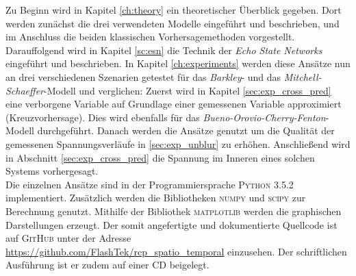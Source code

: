 Zu Beginn wird in Kapitel \ref{ch:theory} ein theoretischer Überblick gegeben. Dort werden zunächst die drei verwendeten Modelle eingeführt und beschrieben, und im Anschluss die beiden klassischen Vorhersagemethoden vorgestellt. Darauffolgend wird in Kapitel \ref{sc:esn} die Technik der \textit{Echo State Networks} eingeführt und beschrieben. In Kapitel \ref{ch:experiments} werden diese Ansätze nun an drei verschiedenen Szenarien getestet für das \textit{Barkley}- und das \textit{Mitchell-Schaeffer}-Modell und verglichen: Zuerst wird in Kapitel \ref{sec:exp_cross_pred} eine verborgene Variable auf Grundlage einer gemessenen Variable approximiert (Kreuzvorhersage). Dies wird ebenfalls für das \textit{Bueno-Orovio-Cherry-Fenton}-Modell durchgeführt. Danach werden die Ansätze genutzt um die Qualität der gemessenen Spannungsverläufe in \ref{sec:exp_unblur} zu erhöhen. Anschließend wird in Abschnitt \ref{sec:exp_cross_pred} die Spannung im Inneren eines solchen Systems vorhergesagt.\\

Die einzelnen Ansätze sind in der Programmiersprache \textsc{Python 3.5.2} implementiert. Zusätzlich werden die Bibliotheken \textsc{numpy} und \textsc{scipy} zur Berechnung genutzt. Mithilfe der Bibliothek \textsc{matplotlib} werden die graphischen Darstellungen erzeugt. Der somit angefertigte und dokumentierte Quellcode ist auf \textsc{GitHub} unter der Adresse \href{https://github.com/FlashTek/rcp\_spatio\_temporal}{https://github.com/FlashTek/rcp\_spatio\_temporal} einzusehen. Der schriftlichen Ausführung ist er zudem auf einer CD beigelegt.